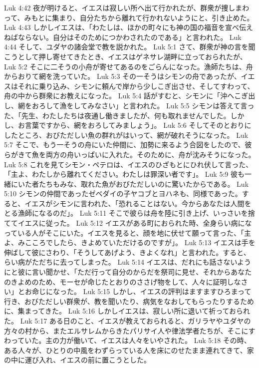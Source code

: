 Luk 4:42  夜が明けると、イエスは寂しい所へ出て行かれたが、群衆が捜しまわって、みもとに集まり、自分たちから離れて行かれないようにと、引き止めた。
Luk 4:43  しかしイエスは、「わたしは、ほかの町々にも神の国の福音を宣べ伝えねばならない。自分はそのためにつかわされたのである」と言われた。
Luk 4:44  そして、ユダヤの諸会堂で教を説かれた。
Luk 5:1  さて、群衆が神の言を聞こうとして押し寄せてきたとき、イエスはゲネサレ湖畔に立っておられたが、
Luk 5:2  そこに二そうの小舟が寄せてあるのをごらんになった。漁師たちは、舟からおりて網を洗っていた。
Luk 5:3  その一そうはシモンの舟であったが、イエスはそれに乗り込み、シモンに頼んで岸から少しこぎ出させ、そしてすわって、舟の中から群衆にお教えになった。
Luk 5:4  話がすむと、シモンに「沖へこぎ出し、網をおろして漁をしてみなさい」と言われた。
Luk 5:5  シモンは答えて言った、「先生、わたしたちは夜通し働きましたが、何も取れませんでした。しかし、お言葉ですから、網をおろしてみましょう」。
Luk 5:6  そしてそのとおりにしたところ、おびただしい魚の群れがはいって、網が破れそうになった。
Luk 5:7  そこで、もう一そうの舟にいた仲間に、加勢に来るよう合図をしたので、彼らがきて魚を両方の舟いっぱいに入れた。そのために、舟が沈みそうになった。
Luk 5:8  これを見てシモン・ペテロは、イエスのひざもとにひれ伏して言った、「主よ、わたしから離れてください。わたしは罪深い者です」。
Luk 5:9  彼も一緒にいた者たちもみな、取れた魚がおびただしいのに驚いたからである。
Luk 5:10  シモンの仲間であったゼベダイの子ヤコブとヨハネも、同様であった。すると、イエスがシモンに言われた、「恐れることはない。今からあなたは人間をとる漁師になるのだ」。
Luk 5:11  そこで彼らは舟を陸に引き上げ、いっさいを捨ててイエスに従った。
Luk 5:12  イエスがある町におられた時、全身らい病になっている人がそこにいた。イエスを見ると、顔を地に伏せて願って言った、「主よ、みこころでしたら、きよめていただけるのですが」。
Luk 5:13  イエスは手を伸ばして彼にさわり、「そうしてあげよう、きよくなれ」と言われた。すると、らい病がただちに去ってしまった。
Luk 5:14  イエスは、だれにも話さないようにと彼に言い聞かせ、「ただ行って自分のからだを祭司に見せ、それからあなたのきよめのため、モーセが命じたとおりのささげ物をして、人々に証明しなさい」とお命じになった。
Luk 5:15  しかし、イエスの評判はますますひろまって行き、おびただしい群衆が、教を聞いたり、病気をなおしてもらったりするために、集まってきた。
Luk 5:16  しかしイエスは、寂しい所に退いて祈っておられた。
Luk 5:17  ある日のこと、イエスが教えておられると、ガリラヤやユダヤの方々の村から、またエルサレムからきたパリサイ人や律法学者たちが、そこにすわっていた。主の力が働いて、イエスは人々をいやされた。
Luk 5:18  その時、ある人々が、ひとりの中風をわずらっている人を床にのせたまま連れてきて、家の中に運び入れ、イエスの前に置こうとした。
